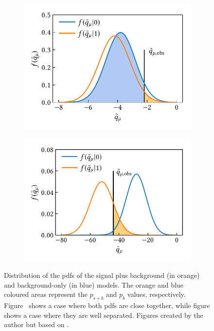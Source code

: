 \begin{figure}
	\centering
	\begin{subfigure}[b]{0.46\linewidth}
		\centering\includegraphics[width=\textwidth]{cls_1}
		\vspace{-1.5em}
		\caption{\label{fig:cls_close}}
	\end{subfigure}\hfill
	\begin{subfigure}[b]{0.47\linewidth}
		\centering\includegraphics[width=\textwidth]{cls_2}
		\vspace{-1.5em}
		\caption{\label{fig:cls_far}}
	\end{subfigure}%
	\caption{Distribution of the \glspl{pdf} of the signal plus background (in orange) and background-only (in blue) models. The orange and blue coloured areas represent the $p_{s+b}$ and $p_{b}$ values, respectively. Figure~ shows a case where both \glspl{pdf} are close together, while figure  shows a case where they are well separated. Figures created by the author but based on \cite{Cowan:2013pha}.}\label{fig:cls_method}
\end{figure}

